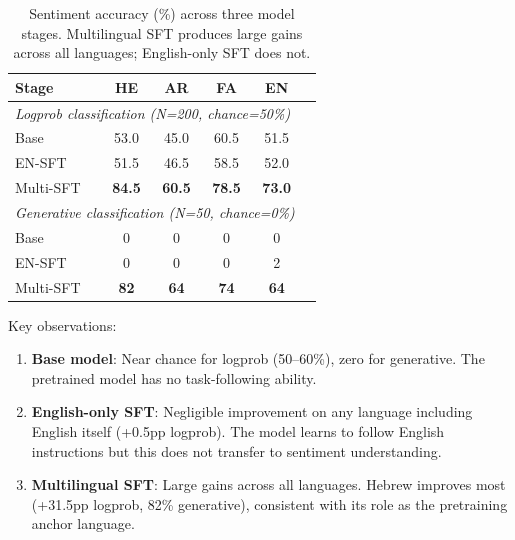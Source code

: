 \documentclass[10pt,twocolumn]{article}
\begin{document}
\begin{table}[H]
\centering\small
\begin{tabular}{lccccc}
\toprule
\textbf{Stage} & \textbf{HE} & \textbf{AR} & \textbf{FA} & \textbf{EN} \\
\midrule
\multicolumn{5}{l}{\textit{Logprob classification (N=200, chance=50\%)}} \\
Base & 53.0 & 45.0 & 60.5 & 51.5 \\
EN-SFT & 51.5 & 46.5 & 58.5 & 52.0 \\
Multi-SFT & \textbf{84.5} & \textbf{60.5} & \textbf{78.5} & \textbf{73.0} \\
\midrule
\multicolumn{5}{l}{\textit{Generative classification (N=50, chance=0\%)}} \\
Base & 0 & 0 & 0 & 0 \\
EN-SFT & 0 & 0 & 0 & 2 \\
Multi-SFT & \textbf{82} & \textbf{64} & \textbf{74} & \textbf{64} \\
\bottomrule
\end{tabular}
\caption{Sentiment accuracy (\%) across three model stages. Multilingual SFT produces large gains across all languages; English-only SFT does not.}
\label{tab:sentiment}
\end{table}

Key observations:
\begin{enumerate}
    \item \textbf{Base model}: Near chance for logprob (50--60\%), zero for generative. The pretrained model has no task-following ability.
    \item \textbf{English-only SFT}: Negligible improvement on any language including English itself (+0.5pp logprob). The model learns to follow English instructions but this does not transfer to sentiment understanding.
    \item \textbf{Multilingual SFT}: Large gains across all languages. Hebrew improves most (+31.5pp logprob, 82\% generative), consistent with its role as the pretraining anchor language.
\end{enumerate}
\end{document}
